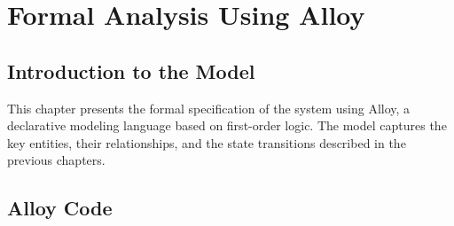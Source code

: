 \chapter{Formal Analysis Using Alloy}
\label{ch:alloy}

\section{Introduction to the Model}
\label{sec:alloy_intro}

This chapter presents the formal specification of the system using Alloy, a declarative modeling language based on first-order logic. The model captures the key entities, their relationships, and the state transitions described in the previous chapters.

\section{Alloy Code}
\label{sec:alloy_code}

